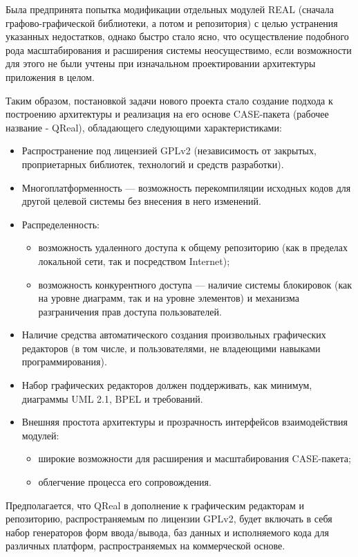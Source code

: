 \documentclass[a5paper]{article}
\begin{document}
Была предпринята попытка модификации отдельных модулей
REAL (сначала графово-графической библиотеки, а потом и репозитория) с целью устранения указанных
недостатков, однако быстро стало ясно, что осуществление подобного рода
масштабирования и расширения системы неосуществимо, если возможности
для этого не были учтены при изначальном проектировании архитектуры
приложения в целом. 

Таким образом, постановкой задачи нового проекта стало создание подхода
к построению архитектуры и реализация на его основе
CASE-пакета (рабочее название - QReal), обладающего следующими характеристиками:

\begin{itemize}
  \item Распространение под лицензией GPLv2
	(независимость от закрытых, проприетарных библиотек, технологий и
	средств разработки).
  \item Многоплатформенность --- возможность перекомпиляции исходных кодов для
	другой целевой системы без внесения в него изменений.
  \item Распределенность:
  \begin{itemize}
	\item 
	  возможность удаленного доступа к общему репозиторию (как в пределах
	  локальной сети, так и посредством Internet);
	\item возможность конкурентного доступа --- наличие системы блокировок (как на
	  уровне диаграмм, так и на уровне элементов) и механизма разграничения
	  прав доступа пользователей.
  \end{itemize}
  \item Наличие средства автоматического создания произвольных графических
	редакторов (в том числе, и пользователями, не владеющими навыками
	программирования).
  \item Набор графических редакторов должен поддерживать, как
	минимум, диаграммы UML 2.1, BPEL и требований.
  \item Внешняя простота архитектуры и прозрачность интерфейсов взаимодействия
	модулей:
  \begin{itemize}
	\item широкие возможности для расширения и масштабирования
	  CASE-пакета;
	\item облегчение процесса его сопровождения.
  \end{itemize}
\end{itemize}

Предполагается, что QReal в дополнение к
графическим редакторам и репозиторию, распространяемым по лицензии
GPLv2, будет включать в себя набор
генераторов форм ввода/вывода, баз данных и исполняемого кода для
различных платформ, распространяемых на коммерческой основе.
\end{document}
